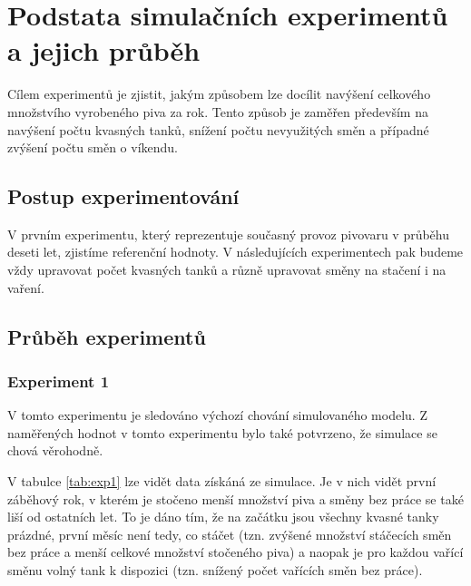 \documentclass[11pt,a4paper]{article}
\begin{document}
\section{Podstata simulačních experimentů a jejich průběh}
Cílem experimentů je zjistit, jakým způsobem lze docílit navýšení celkového množstvího vyrobeného piva za rok. Tento způsob je zaměřen především na navýšení počtu kvasných tanků, snížení počtu nevyužitých směn a případné zvýšení počtu směn o víkendu.

\subsection{Postup experimentování}
V prvním experimentu, který reprezentuje současný provoz pivovaru v průběhu deseti let, zjistíme referenční hodnoty. V následujících experimentech pak budeme vždy upravovat počet kvasných tanků a různě upravovat směny na stačení i na vaření.

\subsection{Průběh experimentů}
\subsubsection{Experiment 1}
V tomto experimentu je sledováno výchozí chování simulovaného modelu. Z naměřených hodnot v tomto experimentu bylo také potvrzeno, že simulace se chová věrohodně.

V tabulce \ref{tab:exp1} lze vidět data získáná ze simulace. Je v nich vidět první záběhový rok, v kterém je stočeno menší množství piva a směny bez práce se také liší od ostatních let. To je dáno tím, že na začátku jsou všechny kvasné tanky prázdné, první měsíc není tedy, co stáčet (tzn. zvýšené množství stáčecích směn bez práce a menší celkové množství stočeného piva) a naopak je pro každou vařící směnu volný tank k dispozici (tzn. snížený počet vařících směn bez práce).
\end{document}
